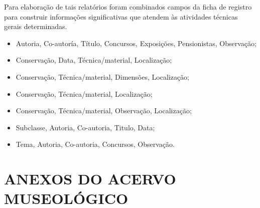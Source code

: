 Para elaboração de tais relatórios foram combinados campos da ficha de registro para construir informações significativas que atendem às atividades técnicas gerais determinadas.
\begin{itemize}
	\item Autoria, Co-autoría, Título, Concursos, Exposições, Pensionistas, Observação;
	\item Conservação, Data, Técnica/material, Localização;
	\item Conservação, Técnica/material, Dimensões, Localização;
	\item Conservação, Técnica/material, Localização;
	\item Conservação, Técnica/material, Observação, Localização;
	\item Subclasse, Autoria, Co-autoria, Titulo, Data;
	\item Tema, Autoria, Co-autoria, Concursos, Observação.
\end{itemize}


\section{ANEXOS DO ACERVO MUSEOLÓGICO}
